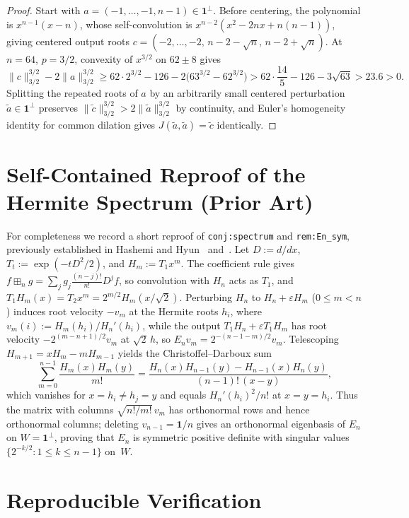 \documentclass[11pt]{article}
\theoremstyle{plain}
\theoremstyle{definition}
\theoremstyle{remark}
\newcommand{\one}{\mathbf{1}}
\begin{document}
\begin{proof}
Start with $a = (-1,\dots,-1,n-1) \in \one^\perp$. Before centering, the polynomial is $x^{n-1}(x-n)$, whose self-convolution is $x^{n-2}(x^2 - 2nx + n(n-1))$, giving centered output roots $c = (-2,\dots,-2,\, n-2-\sqrt{n},\, n-2+\sqrt{n})$. At $n = 64$, $p = 3/2$, convexity of $x^{3/2}$ on $62 \pm 8$ gives
\[
\|c\|_{3/2}^{3/2} - 2\|a\|_{3/2}^{3/2}
\ge 62 \cdot 2^{3/2} - 126 - 2\bigl(63^{3/2} - 62^{3/2}\bigr)
> 62 \cdot \frac{14}{5} - 126 - 3\sqrt{63} > 23.6 > 0.
\]
Splitting the repeated roots of $a$ by an arbitrarily small centered perturbation $\tilde{a} \in \one^\perp$ preserves $\|\tilde{c}\|_{3/2}^{3/2} > 2\|\tilde{a}\|_{3/2}^{3/2}$ by continuity, and Euler's homogeneity identity for common dilation gives $J(\tilde{a},\tilde{a}) = \tilde{c}$ identically.
\end{proof}

\section{Self-Contained Reproof of the Hermite Spectrum (Prior Art)}

For completeness we record a short reproof of \texttt{conj:spectrum} and \texttt{rem:En\_sym}, previously established in Hashemi and Hyun~\cite[Appendix~A]{HashemiHyun2026} and~\cite{MachinaSpec}. Let $D := d/dx$, $T_t := \exp(-t D^2/2)$, and $H_m := T_1 x^m$. The coefficient rule gives $f \boxplus_n g = \sum_j g_j \frac{(n-j)!}{n!} D^j f$, so convolution with $H_n$ acts as $T_1$, and $T_1 H_m(x) = T_2 x^m = 2^{m/2} H_m(x/\sqrt{2})$. Perturbing $H_n$ to $H_n + \varepsilon H_m$ ($0 \le m < n$) induces root velocity $-v_m$ at the Hermite roots $h_i$, where $v_m(i) := H_m(h_i)/H_n'(h_i)$, while the output $T_1 H_n + \varepsilon T_1 H_m$ has root velocity $-2^{(m-n+1)/2} v_m$ at $\sqrt{2}\, h$, so $E_n v_m = 2^{-(n-1-m)/2} v_m$. Telescoping $H_{m+1} = x H_m - m H_{m-1}$ yields the Christoffel--Darboux sum
\[
\sum_{m=0}^{n-1} \frac{H_m(x) H_m(y)}{m!}
= \frac{H_n(x) H_{n-1}(y) - H_{n-1}(x) H_n(y)}{(n-1)!\,(x-y)},
\]
which vanishes for $x = h_i \neq h_j = y$ and equals $H_n'(h_i)^2 / n!$ at $x = y = h_i$. Thus the matrix with columns $\sqrt{n!/m!}\, v_m$ has orthonormal rows and hence orthonormal columns; deleting $v_{n-1} = \one/n$ gives an orthonormal eigenbasis of $E_n$ on $W = \one^\perp$, proving that $E_n$ is symmetric positive definite with singular values $\{2^{-k/2} : 1 \le k \le n-1\}$ on~$W$.

\section{Reproducible Verification}
\end{document}
